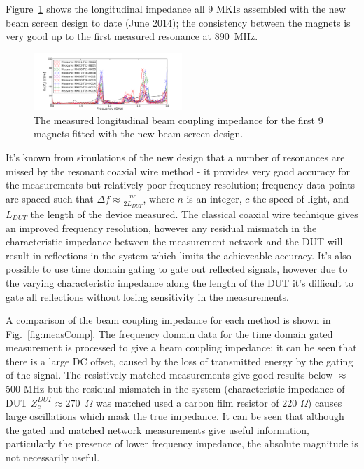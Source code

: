 \documentclass[a4paper,
              ]{jacow}
\begin{document}
Figure~\ref{fig:allNewMKIImp} shows the longitudinal impedance all 9 MKIs assembled with the new beam screen design to date (June 2014); the consistency between the magnets is very good up to the first measured resonance at 890~MHz. 

\begin{figure}
\includegraphics[width=0.5\textwidth]{TUPRI030f4.pdf}
\caption{The measured longitudinal beam coupling impedance for the first 9 magnets fitted with the new beam screen design.}
\label{fig:allNewMKIImp}
\end{figure}

It's known from simulations of the new design \cite{DayThesis} that a number of resonances are missed by the resonant coaxial wire method - it provides very good accuracy for the measurements but relatively poor frequency resolution; frequency data points are spaced such that $\Delta f \approx \frac{nc}{2L_{DUT}}$, where $n$ is an integer, $c$ the speed of light, and $L_{DUT}$ the length of the device measured. The classical coaxial wire technique gives an improved frequency resolution, however any residual mismatch in the characteristic impedance between the measurement network and the DUT will result in reflections in the system which limits the achieveable accuracy. It's also possible to use time domain gating to gate out reflected signals, however due to the varying characteristic impedance along the length of the DUT it's difficult to gate all reflections without losing sensitivity in the measurements.

A comparison of the beam coupling impedance for each method is shown in Fig.~\ref{fig:measComp}. The frequency domain data for the time domain gated measurement is processed to give a beam coupling impedance: it can be seen that there is a large DC offset, caused by the loss of transmitted energy by the gating of the signal. The resistively matched measurements give good results below $\approx$ 500 MHz but the residual mismatch in the system (characteristic impedance of DUT $Z_{c}^{DUT}\approx 270$~$\Omega$ was matched used a carbon film resistor of 220 $\Omega$) causes large oscillations which mask the true impedance. It can be seen that although the gated and matched network measurements give useful information, particularly the presence of lower frequency impedance, the absolute magnitude is not necessarily useful.
\end{document}
